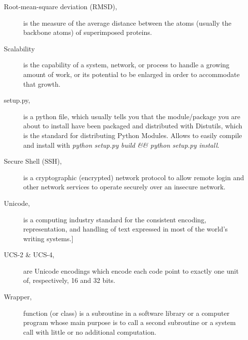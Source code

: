 \begin{description}
\item [Root-mean-square deviation (RMSD),] is the measure of the average distance between the atoms (usually the backbone atoms) of superimposed proteins.
\item [Scalability] is the capability of a system, network, or process to handle a growing amount of work, or its potential to be enlarged in order to accommodate that growth.
\item [setup.py,] is a python file, which usually tells you that the module/package you are about to install have been packaged and distributed with Distutils, which is the standard for distributing Python Modules. Allows to easily compile and install with \textit{python setup.py build \&\& python setup.py install}.
\item [Secure Shell (SSH),]  is a cryptographic (encrypted) network protocol to allow remote login and other network services to operate securely over an insecure network. 
\item [Unicode,] is a computing industry standard for the consistent encoding, representation, and handling of text expressed in most of the world's writing systems.]
\item [UCS-2 \& UCS-4, ] are Unicode encodings which encode each code point to exactly one unit of, respectively, 16 and 32 bits. 
\item [Wrapper,]  function (or class) is a subroutine in a software library or a computer program whose main purpose is to call a second subroutine or a system call with little or no additional computation. 

\end{description}